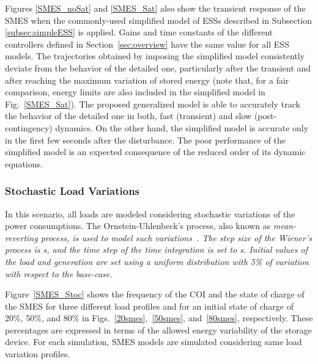\documentclass[journal, a4paper]{IEEEtran}
\begin{document}
Figures \ref{SMES_noSat} and \ref{SMES_Sat} also show the transient
response of the SMES when the commonly-used simplified model of ESSs described in
Subsection \ref{subsec:simpleESS} is applied.  Gains and time
  constants of the different controllers defined in
  Section~\ref{sec:overview} have the same value for all ESS models.
The trajectories obtained by imposing the simplified model
consistently deviate from the behavior of the detailed one,
particularly after the transient and after reaching the maximum variation of stored
  energy (note that, for a fair comparison, energy limits are also
included in the simplified model in Fig.~\ref{SMES_Sat}). 
The proposed generalized model is able to accurately track the behavior
  of the detailed one in both, fast (transient) and slow
  (post-contingency) dynamics. On the other hand, the simplified model
  is accurate only in the first few seconds after the disturbance.
  The poor performance of the simplified model is an expected
  consequence of the reduced order of its dynamic equations.

\subsubsection{Stochastic Load Variations}
\label{subsub:smesstoc}



In this scenario, all loads are modeled considering stochastic variations
of the power consumptions.
The Ornstein-Uhlenbeck’s process, also known as \it mean-reverting \rm process, is
used to model such variations~\cite{perninge:10, milano:2013}. 
The step size of the Wiener's process is s, and the time
step of the time integration  is set to s. Initial values of the load and 
generation are set using a uniform distribution with 5\% of variation with respect to the base-case.

Figure~\ref{SMES_Stoc} shows the frequency of the COI and the state of charge of the SMES 
for three different load profiles and for an initial state of charge of 
20\%, 50\%, and 80\% in Figs.~\ref{20smes},~\ref{50smes}, and~\ref{80smes}, respectively.
These percentages are expressed in terms of the allowed energy 
variability of the storage device.
For each simulation, SMES models are simulated considering same load variation profiles. 
\end{document}
